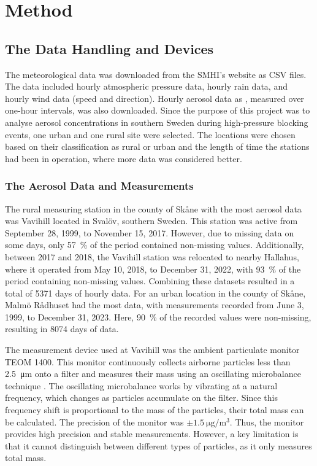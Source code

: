 \newpage
\section{Method} 

\subsection{The Data Handling and Devices}
The meteorological data was downloaded from the SMHI’s website as CSV files. The data included hourly atmospheric pressure data, hourly rain data, and hourly wind data (speed and direction). Hourly aerosol data as \PM, measured over one-hour intervals, was also downloaded. Since the purpose of this project was to analyse aerosol concentrations in southern Sweden during high-pressure blocking events, one urban and one rural site were selected. The locations were chosen based on their classification as rural or urban and the length of time the stations had been in operation, where more data was considered better. 

\subsubsection{The Aerosol Data and Measurements}
The rural measuring station in the county of Skåne with the most aerosol data was Vavihill located in Svalöv, southern Sweden. This station was active from September 28, 1999, to November 15, 2017. However, due to missing data on some days, only \SI{57}{\%} of the period contained non-missing values. Additionally, between 2017 and 2018, the Vavihill station was relocated to nearby Hallahus, where it operated from May 10, 2018, to December 31, 2022, with \SI{93}{\%} of the period containing non-missing values. Combining these datasets resulted in a total of \SI{5371}{} days of hourly data. For an urban location in the county of Skåne, Malmö Rådhuset had the most data, with measurements recorded from June 3, 1999, to December 31, 2023. Here, \SI{90}{\%} of the recorded values were non-missing, resulting in \SI{8074}{} days of data. 

The measurement device used at Vavihill was the ambient particulate monitor TEOM 1400. This monitor continuously collects airborne particles less than \SI{2.5}{\micro\meter} onto a filter and measures their mass using an oscillating microbalance technique \cite{thermofisherscientificinc.TEOMSeries1400a2007}. The oscillating microbalance works by vibrating at a natural frequency, which changes as particles accumulate on the filter. Since this frequency shift is proportional to the mass of the particles, their total mass can be calculated. The precision of the monitor was $\pm\SI{1.5}{\micro\gram\per\meter\cubed}$. Thus, the monitor provides high precision and stable measurements. However, a key limitation is that it cannot distinguish between different types of particles, as it only measures total mass.


